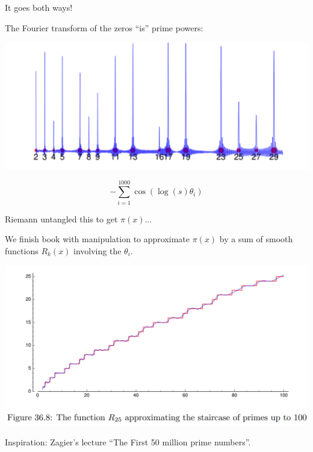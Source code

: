 \documentclass{beamer}
\begin{document}
\begin{frame}{It goes both ways!}

  The Fourier transform of the zeros ``is'' prime powers:

  \begin{center}
    \includegraphics[height=.55\textheight]{pics/zeros-series-1000}
  \end{center}

  $$-\sum_{i=1}^{1000}
  \cos(\log(s)\theta_i)$$


\end{frame}

\begin{frame}{Riemann untangled this to get $\pi(x)$...}

  We finish book with manipulation to approximate $\pi(x)$
  by a sum of smooth functions $R_k(x)$ involving the $\theta_i$.
  \vfill

  \includegraphics[height=.65\textheight]{pics/R25-approx}

  \vfill
  Inspiration: Zagier's lecture ``The First 50 million prime numbers''.
\end{frame}
\end{document}
